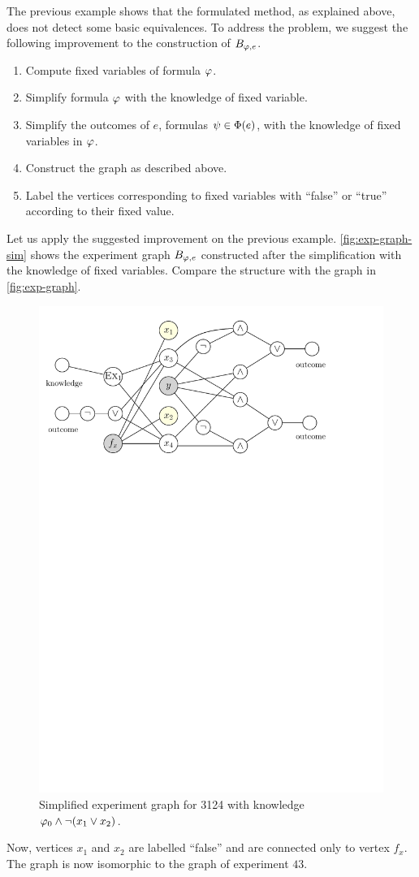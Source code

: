 The previous example shows that the formulated method, as explained above,
  does not detect some basic equivalences.
To address the problem, we suggest the following improvement to the construction
  of $B_{\varphi, e}$.
\begin{enumerate}
\item Compute fixed variables of formula $\varphi$.
\item Simplify formula $\varphi$ with the knowledge of fixed variable.
\item Simplify the outcomes of $e$, formulas $\psi\in\Phi(e)$, with
  the knowledge of fixed variables in $\varphi$.
\item Construct the graph as described above.
\item Label the vertices corresponding to fixed variables with ``false'' or ``true''
  according to their fixed value.
\end{enumerate}

\begin{example}
Let us apply the suggested improvement on the previous example.
\autoref{fig:exp-graph-sim} shows the experiment graph $B_{\varphi, e}$
  constructed after the simplification with the knowledge of fixed variables.
Compare the structure with the graph in \autoref{fig:exp-graph}.

\begin{figure}[h]
\begin{center}
\includegraphics[width=.7\textwidth]{pictures/exp-graph-sim.pdf}
\caption{Simplified experiment graph for 3124 with knowledge $\varphi_0\wedge\neg(x_1\vee x_2)$.}
\label{fig:exp-graph-sim}
\end{center}
\end{figure}
Now, vertices $x_1$ and $x_2$ are labelled ``false'' and are connected
  only to vertex $f_x$.
The graph is now isomorphic to the graph of experiment $43$.\eqed
\end{example}

